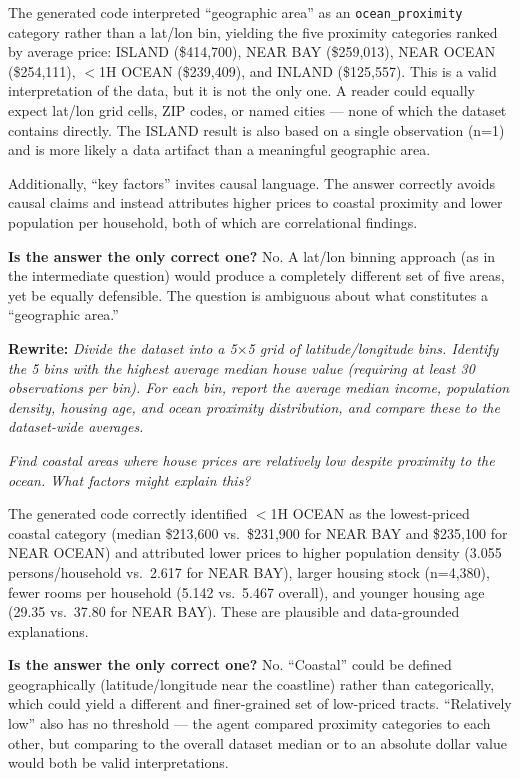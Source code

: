 \documentclass[12pt, oneside]{report}
\begin{document}
The generated code interpreted ``geographic area'' as an \texttt{ocean\_proximity} category rather than a lat/lon bin, yielding the five proximity categories ranked by average price: ISLAND (\$414,700), NEAR BAY (\$259,013), NEAR OCEAN (\$254,111), $<$1H OCEAN (\$239,409), and INLAND (\$125,557). This is a valid interpretation of the data, but it is not the only one. A reader could equally expect lat/lon grid cells, ZIP codes, or named cities --- none of which the dataset contains directly. The ISLAND result is also based on a single observation (n=1) and is more likely a data artifact than a meaningful geographic area.

Additionally, ``key factors'' invites causal language. The answer correctly avoids causal claims and instead attributes higher prices to coastal proximity and lower population per household, both of which are correlational findings.

\textbf{Is the answer the only correct one?} No. A lat/lon binning approach (as in the intermediate question) would produce a completely different set of five areas, yet be equally defensible. The question is ambiguous about what constitutes a ``geographic area.''

\textbf{Rewrite:} \textit{Divide the dataset into a 5$\times$5 grid of latitude/longitude bins. Identify the 5 bins with the highest average median house value (requiring at least 30 observations per bin). For each bin, report the average median income, population density, housing age, and ocean proximity distribution, and compare these to the dataset-wide averages.}


\textit{Find coastal areas where house prices are relatively low despite proximity to the ocean. What factors might explain this?}

The generated code correctly identified $<$1H OCEAN as the lowest-priced coastal category (median \$213,600 vs.\ \$231,900 for NEAR BAY and \$235,100 for NEAR OCEAN) and attributed lower prices to higher population density (3.055 persons/household vs.\ 2.617 for NEAR BAY), larger housing stock (n=4,380), fewer rooms per household (5.142 vs.\ 5.467 overall), and younger housing age (29.35 vs.\ 37.80 for NEAR BAY). These are plausible and data-grounded explanations.

\textbf{Is the answer the only correct one?} No. ``Coastal'' could be defined geographically (latitude/longitude near the coastline) rather than categorically, which could yield a different and finer-grained set of low-priced tracts. ``Relatively low'' also has no threshold --- the agent compared proximity categories to each other, but comparing to the overall dataset median or to an absolute dollar value would both be valid interpretations.
\end{document}
